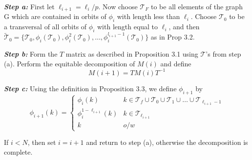 \documentclass[preprint,12pt]{elsarticle}
\newcommand{\cT}{\mathcal{T}}
\theoremstyle{definition}
\theoremstyle{remark}
\renewcommand{\emph}{\textit}
\begin{document}
\vspace{0.1in}

\noindent\emph{\textbf{Step a:}} First let $\ell_{i+1}=\ell_i/p$. Now choose $\mathcal{T}_F$ to be all elements of the graph G which are contained in orbits of $\phi_i$ with length less than $\ell_i$.  Choose $\mathcal{T}_0$ to be a transversal of all orbits of $\phi_i$ with length equal to $\ell_i$, and then $\tilde{\mathcal{T}}_0=\{\mathcal{T}_0,\phi_i({\mathcal{T}_0}),\phi_i^2(\mathcal{T}_0),\dots,\phi_i^{l_{i+1}-1}({\mathcal{T}_0})\}$ as in Prop 3.2. %

\noindent\emph{\textbf{Step b:}} Form the $T$ matrix as described in Proposition 3.1 using $\mathcal{T}$'s from step (a). Perform the equitable decomposition of $M(i)$ and define \[M(i+1)=TM(i)T^{-1}\]

\noindent\emph{\textbf{Step c:}} Using the definition in Proposition 3.3, we define $\phi_{i+1}$ by
\begin{equation}
\phi_{i+1}(k) = \left\{\begin{array}{ll}
\phi_i(k) & k \in \cT_f\cup\cT_0\cup\cT_1\cup\dots\cup\cT_{\ell_{i+1}-1}\\
\phi_i^{1-\ell_{i+1}}(k) &  k \in \cT_{\ell_{i+1}}\\
k & o/w
\end{array}\right.
\end{equation}\label{eq:6}

 If $i<N$, then set $i=i+1$ and return to step (a), otherwise the decomposition is complete.
\par\endgroup
\end{document}
